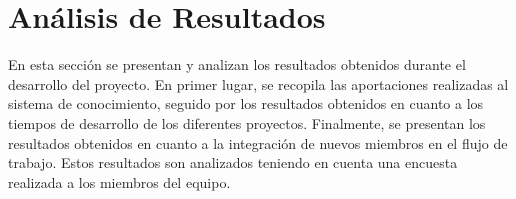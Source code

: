 \section{Análisis de Resultados}
En esta sección se presentan y analizan los resultados obtenidos
durante el desarrollo del proyecto. En primer lugar, se recopila 
las aportaciones realizadas al sistema de conocimiento, seguido
por los resultados obtenidos en cuanto a los tiempos de desarrollo
de los diferentes proyectos. Finalmente, se presentan los resultados
obtenidos en cuanto a la integración de nuevos miembros en el flujo
de trabajo. Estos resultados son analizados teniendo en cuenta una
encuesta realizada a los miembros del equipo.





\pagebreak
